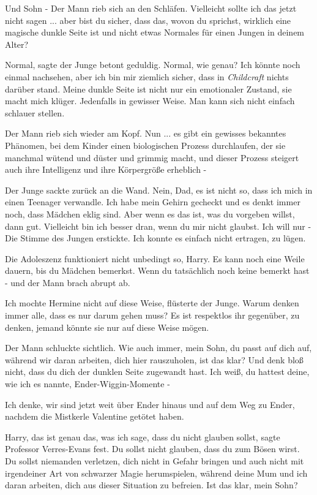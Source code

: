 \glqq Und Sohn -\grqq{} Der Mann rieb sich an den Schläfen. \glqq Vielleicht
sollte ich das jetzt nicht sagen ... aber bist du sicher, dass das, wovon du
sprichst, wirklich eine magische dunkle Seite ist und nicht etwas Normales für
einen Jungen in deinem Alter?\grqq{}

\glqq Normal\grqq{}, sagte der Junge betont geduldig. \glqq Normal, wie genau?
Ich könnte noch einmal nachsehen, aber ich bin mir ziemlich sicher, dass in
\emph{Childcraft} nichts darüber stand. Meine dunkle Seite ist nicht nur ein
emotionaler Zustand, sie macht mich klüger. Jedenfalls in gewisser Weise. Man
kann sich nicht einfach schlauer stellen.\grqq{}

Der Mann rieb sich wieder am Kopf. \glqq Nun ... es gibt ein gewisses bekanntes
Phänomen, bei dem Kinder einen biologischen Prozess durchlaufen, der sie
manchmal wütend und düster und grimmig macht, und dieser Prozess steigert auch
ihre Intelligenz und ihre Körpergröße erheblich -\grqq{}

Der Junge sackte zurück an die Wand. \glqq Nein, Dad, es ist nicht so, dass ich
mich in einen Teenager verwandle. Ich habe mein Gehirn gecheckt und es denkt
immer noch, dass Mädchen eklig sind. Aber wenn es das ist, was du vorgeben
willst, dann gut. Vielleicht bin ich besser dran, wenn du mir nicht glaubst. Ich
will nur -\grqq{} Die Stimme des Jungen erstickte. \glqq Ich konnte es einfach
nicht ertragen, zu lügen.\grqq{}

\glqq Die Adoleszenz funktioniert nicht unbedingt so, Harry. Es kann noch eine
Weile dauern, bis du Mädchen bemerkst. Wenn du tatsächlich noch keine bemerkt
hast -\grqq{} und der Mann brach abrupt ab.

\glqq Ich mochte Hermine nicht auf diese Weise\grqq{}, flüsterte der Junge.
\glqq Warum denken immer alle, dass es nur darum gehen muss? Es ist respektlos
ihr gegenüber, zu denken, jemand könnte sie nur auf diese Weise mögen.\grqq{}

Der Mann schluckte sichtlich. \glqq Wie auch immer, mein Sohn, du passt auf dich
auf, während wir daran arbeiten, dich hier rauszuholen, ist das klar? Und denk
bloß nicht, dass du dich der dunklen Seite zugewandt hast. Ich weiß, du hattest
deine, wie ich es nannte, Ender-Wiggin-Momente -\grqq{}

\glqq Ich denke, wir sind jetzt weit über Ender hinaus und auf dem Weg zu Ender,
nachdem die Mistkerle Valentine getötet haben.\grqq{}

\glqq Harry, das ist genau das, was ich sage, dass du nicht glauben
sollst\grqq{}, sagte Professor Verres-Evans fest. \glqq Du sollst nicht glauben,
dass du zum Bösen wirst. Du sollst niemanden verletzen, dich nicht in Gefahr
bringen und auch nicht mit irgendeiner Art von schwarzer Magie herumspielen,
während deine Mum und ich daran arbeiten, dich aus dieser Situation zu befreien.
Ist das klar, mein Sohn?\grqq{}

